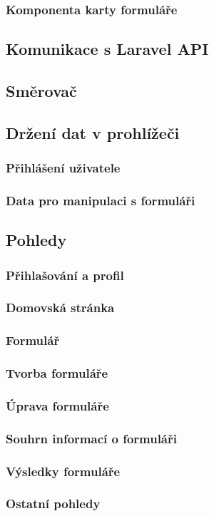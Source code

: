 		\subsubsection{Komponenta karty formuláře} %
		
	
	\subsection{Komunikace s Laravel API}
	
	\subsection{Směrovač} %
	
	\subsection{Držení dat v prohlížeči} %
	
	
		\subsubsection{Přihlášení uživatele}
		
		
		\subsubsection{Data pro manipulaci s formuláři}\label{sec:data_prohlizec_form}
		
	
	\subsection{Pohledy}
		
		\subsubsection{Přihlašování a profil}
		
		\subsubsection{Domovská stránka}
		
		\subsubsection{Formulář}
		
		\subsubsection{Tvorba formuláře}
		
		\subsubsection{Úprava formuláře}
		
		\subsubsection{Souhrn informací o formuláři}
		
		\subsubsection{Výsledky formuláře}
		
		\subsubsection{Ostatní pohledy}
